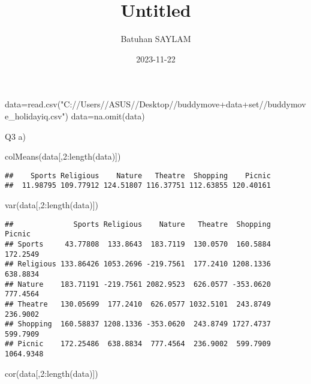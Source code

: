 \documentclass[
]{article}
\title{Untitled}
\author{Batuhan SAYLAM}
\date{2023-11-22}
\newenvironment{Shaded}{\begin{snugshade}}{\end{snugshade}}
\newcommand{\DecValTok}[1]{\textcolor[rgb]{0.00,0.00,0.81}{#1}}
\newcommand{\FunctionTok}[1]{\textcolor[rgb]{0.00,0.00,0.00}{#1}}
\newcommand{\NormalTok}[1]{#1}
\newcommand{\OtherTok}[1]{\textcolor[rgb]{0.56,0.35,0.01}{#1}}
\newcommand{\SpecialCharTok}[1]{\textcolor[rgb]{0.00,0.00,0.00}{#1}}
\newcommand{\StringTok}[1]{\textcolor[rgb]{0.31,0.60,0.02}{#1}}
\begin{document}
\maketitle

\begin{Shaded}
\begin{Highlighting}[]
\NormalTok{data}\OtherTok{=}\FunctionTok{read.csv}\NormalTok{(}\StringTok{"C://Users//ASUS//Desktop//buddymove+data+set//buddymove\_holidayiq.csv"}\NormalTok{)}
\NormalTok{data}\OtherTok{=}\FunctionTok{na.omit}\NormalTok{(data)}
\end{Highlighting}
\end{Shaded}

Q3 a)

\begin{Shaded}
\begin{Highlighting}[]
\FunctionTok{colMeans}\NormalTok{(data[,}\DecValTok{2}\SpecialCharTok{:}\FunctionTok{length}\NormalTok{(data)])}
\end{Highlighting}
\end{Shaded}

\begin{verbatim}
##    Sports Religious    Nature   Theatre  Shopping    Picnic 
##  11.98795 109.77912 124.51807 116.37751 112.63855 120.40161
\end{verbatim}

\begin{Shaded}
\begin{Highlighting}[]
\FunctionTok{var}\NormalTok{(data[,}\DecValTok{2}\SpecialCharTok{:}\FunctionTok{length}\NormalTok{(data)])}
\end{Highlighting}
\end{Shaded}

\begin{verbatim}
##              Sports Religious    Nature   Theatre  Shopping    Picnic
## Sports     43.77808  133.8643  183.7119  130.0570  160.5884  172.2549
## Religious 133.86426 1053.2696 -219.7561  177.2410 1208.1336  638.8834
## Nature    183.71191 -219.7561 2082.9523  626.0577 -353.0620  777.4564
## Theatre   130.05699  177.2410  626.0577 1032.5101  243.8749  236.9002
## Shopping  160.58837 1208.1336 -353.0620  243.8749 1727.4737  599.7909
## Picnic    172.25486  638.8834  777.4564  236.9002  599.7909 1064.9348
\end{verbatim}

\begin{Shaded}
\begin{Highlighting}[]
\FunctionTok{cor}\NormalTok{(data[,}\DecValTok{2}\SpecialCharTok{:}\FunctionTok{length}\NormalTok{(data)])}
\end{Highlighting}
\end{Shaded}
\end{document}
